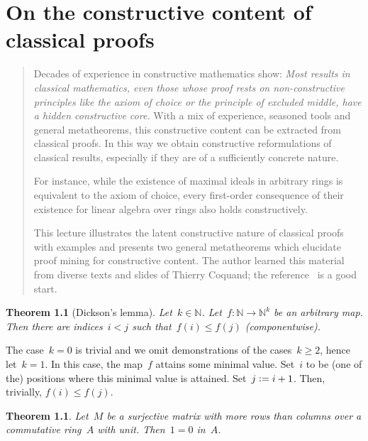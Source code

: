\documentclass[10pt,reqno,a4paper,openany]{amsbook}
\makeatletter
\theoremstyle{definition}
\theoremstyle{plain}
\newtheorem{thm}[defn]{Theorem}
\theoremstyle{remark}
\newcommand{\NN}{\mathbb{N}}
\newcommand{\?}{\,{:}\,}
\renewcommand{\_}{\mathpunct{.}\,}
\newcommand{\defeq}{\vcentcolon=}
\renewenvironment{proof}[1][\proofname]{\par
  \pushQED{\qed}%
  \normalfont \topsep6\p@\@plus6\p@\relax
  \trivlist
  \item[\hskip\labelsep
        \itshape
    #1\@addpunct{.}]\ignorespaces
}{%
  \popQED\endtrivlist\@endpefalse
}
\newenvironment{intro}{\begin{quote}}{\end{quote}\bigskip\noindent}
\makeatother
\begin{document}
\chapter{On the constructive content of classical proofs}
\label{lect:constructive-content}

\begin{intro}
Decades of experience in constructive mathematics show: \emph{Most results
in classical mathematics, even those whose proof rests on
non-constructive principles like the axiom of choice or the principle of
excluded middle, have a hidden constructive core.} With a mix of
experience, seasoned tools and general metatheorems, this constructive
content can be extracted from classical proofs. In this way we obtain
constructive reformulations of classical results, especially
if they are of a sufficiently concrete nature.

For instance, while the existence of maximal ideals in arbitrary rings
is equivalent to the axiom of choice, every first-order consequence of
their existence for linear algebra over rings also holds constructively.

This lecture illustrates the latent constructive nature of classical
proofs with examples and presents two general metatheorems which
elucidate proof mining for constructive content. The author learned this
material from diverse texts and slides of Thierry Coquand; the
reference~\cite{coquand:classical} is a good start.
\end{intro}

\begin{thm}[Dickson's lemma]\label{thm:dickson}
Let~$k \in \NN$. Let~$f : \NN \to \NN^k$ be an arbitrary map. Then there are
indices~$i < j$ such that~$f(i) \leq f(j)$ (componentwise).
\end{thm}

\begin{proof}[Proof (classical)]The case~$k = 0$ is trivial and we omit demonstrations of the cases~$k
\geq 2$, hence let~$k = 1$. In this case, the map~$f$ attains some minimal
value. Set~$i$ to be (one of the) positions where this minimal value is
attained. Set~$j \defeq i+1$. Then, trivially, $f(i) \leq f(j)$.
\end{proof}

\begin{thm}\label{thm:surjective-matrix}
Let~$M$ be a surjective matrix with more rows than columns over a commutative
ring~$A$ with unit. Then~$1 = 0$ in~$A$.
\end{thm}
\end{document}
